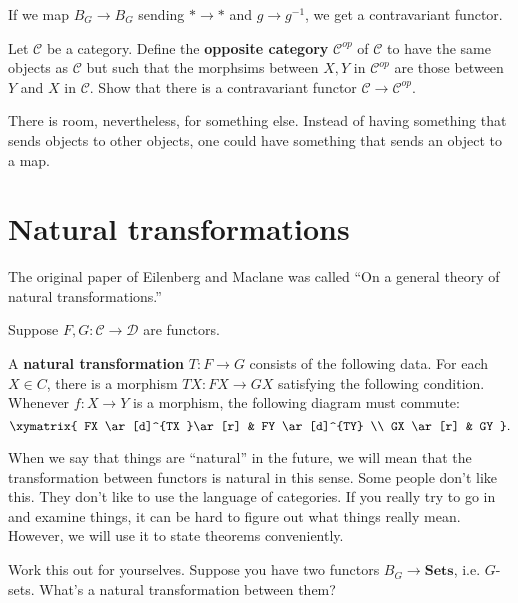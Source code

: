 \begin{example}
If we map $B_G \to B_G$ sending $\ast \to \ast$ and $g \to g^{-1}$, we get a
contravariant functor.
\end{example}

\begin{exercise}
Let $\mathcal{C}$ be a category. Define the \textbf{opposite category}
$\mathcal{C}^{op}$ of $\mathcal{C}$ to have the same objects as
$\mathcal{C}$  but such that the morphsims between $X,Y$ in
$\mathcal{C}^{op}$
are those between $Y$ and $X$ in $\mathcal{C}$.
Show that there is a contravariant functor $\mathcal{C} \to
\mathcal{C}^{op}$.
\end{exercise}

There is room, nevertheless, for something else. Instead of having
something that sends objects to other objects, one could have something that
sends an object to a map.


\section{Natural transformations}

The original paper of Eilenberg and Maclane was called ``On a general theory of
natural transformations.''


Suppose $F, G: \mathcal{C} \to \mathcal{D}$ are functors.

\begin{definition}
A \textbf{natural transformation} $T: F \to G$ consists of the following data.
For each $X \in C$, there is a morphism $TX: FX \to GX$ satisfying the
following
condition. Whenever $f: X \to Y$ is a morphism, the following diagram must
commute:
\[ \xymatrix{
FX \ar[d]^{TX }\ar[r] &  FY \ar[d]^{TY}  \\
GX \ar[r] &  GY
}.\]
\end{definition}

When we say that things are ``natural'' in the future, we will mean that the
transformation between functors is natural in this sense.
Some people don't like this. They don't like to use the language of categories.
If you really try to go in and examine things, it can be hard to figure out
what things really mean.
However, we will use it to state theorems conveniently.


\begin{exercise}
Work this out for yourselves. Suppose you have two functors $B_G \to
\mathbf{Sets}$, i.e. $G$-sets. What's a natural transformation between them?
\end{exercise}

